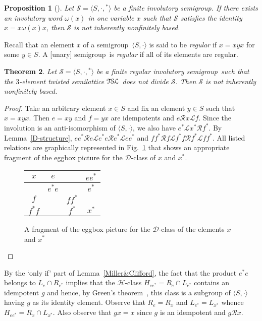 \documentclass[11pt,reqno]{amsart}
\def\om{\omega}
\def\Rc{\mathrel{\mathscr{R}}}
\def\Lc{\mathrel{\mathscr{L}}}
\newcommand{\sgp}{semi\-group}
\newcommand{\is}{involutory semi\-group}
\newcommand{\fis}{finite involutory semi\-group}
\newcommand{\infb}{inherently non\-finitely based}
\newcommand{\TSL}{\ensuremath{\mathcal{T\kern-.5pt S\kern-.5pt L}}}
\newtheorem{Thm}{Theorem}[section]
\newtheorem{Prop}[Thm]{Proposition}
\begin{document}
\begin{Prop}[{\mdseries\cite[Proposition~2.9]{ADV:2012}}]
\label{NINFB} Let $\mathcal{S}=\langle S,\cdot,{}^*\rangle$ be a \fis. If there exists an involutory word $\om(x)$ in one variable $x$ such
that $\mathcal{S}$ satisfies the identity $x=x\om(x)x$, then $\mathcal{S}$ is not \infb.
\end{Prop}

Recall that an element $x$ of a \sgp\ $\langle S,\cdot\rangle$ is said to be \emph{regular} if $x=xyx$ for some $y\in S$. A [unary] \sgp\
is \emph{regular} if all of its elements are regular.

\begin{Thm}
\label{regular} Let $\mathcal{S}=\langle S,\cdot,{}^*\rangle$ be a finite regular \is\ such that the $3$-element twisted semilattice $\TSL$
does not divide $\mathcal{S}$. Then $\mathcal{S}$ is not \infb.
\end{Thm}

\begin{proof}
Take an arbitrary element $x\in S$ and fix an element $y\in S$ such that $x=xyx$. Then $e=xy$ and $f=yx$ are idempotents and $e\Rc x\Lc f$.
Since the involution is an anti-isomorphism of $\langle S,\cdot\rangle$, we also have $e^*\Lc x^*\Rc f^*$. By Lemma~\ref{D-structure},
$ee^*\Rc e\Lc e^*e\Rc e^*\Lc ee^*$ and $ff^*\Rc f\Lc f^*f\Rc f^*\Lc ff^*$.  All listed relations are graphically represented in
Fig.~\ref{fig:D-class} that shows an appropriate fragment of the eggbox picture for the $\mathscr{D}$-class of $x$ and $x^*$.
\begin{figure}[th]
\begin{center}
{\large \begin{tabular}{|c|c|c|c|}
\hline $x$\rule[-5pt]{0pt}{16pt} & $e$ & & $ee^*$\\
\hline \rule[-5pt]{0pt}{16pt}& $e^*e$  & & $e^*$\\
\hline $f$\rule[-5pt]{0pt}{16pt} & \phantom{$f^*f$} & $ff^*$ &  \phantom{$f^*f$}\\
\hline $f^*f$\rule[-5pt]{0pt}{16pt} & & $f^*$ & $x^*$ \\
\hline
\end{tabular}}
\caption{A fragment of the eggbox picture for the $\mathscr{D}$-class of the elements $x$ and $x^*$}\label{fig:D-class}
\end{center}
\end{figure}
\end{proof}

By the `only if' part of Lemma~\ref{Miller&Clifford}, the fact that the product $e^*e$ belongs to $L_e\cap R_{e^*}$ implies that the
$\mathscr{H}$-class $H_{ee^*}=R_e\cap L_{e^*}$ contains an idempotent $g$ and hence, by Green's theorem~\cite[Theorem~2.2.5]{how}, this
class is a subgroup of $\langle S,\cdot\rangle$ having $g$ as its identity element. Observe that $R_e=R_x$ and $L_{e^*}=L_{x^*}$ whence
$H_{ee^*}=R_x\cap L_{x^*}$. Also observe that $gx=x$ since $g$ is an idempotent and $g\Rc x$.
\end{document}
